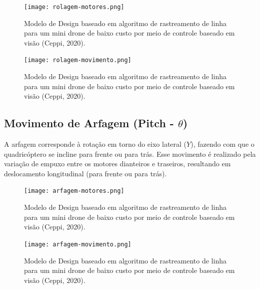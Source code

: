 \begin{figure}[ht]
	\centering
	\texttt{[image: rolagem-motores.png]} %
	\caption{Modelo de Design baseado em algoritmo de rastreamento de linha para um mini drone de baixo custo por meio de controle baseado em visão (Ceppi, 2020).}
	\label{fig:line_tracking_algorithm}
\end{figure}

\begin{figure}[ht]
	\centering
	\texttt{[image: rolagem-movimento.png]} %
	\caption{Modelo de Design baseado em algoritmo de rastreamento de linha para um mini drone de baixo custo por meio de controle baseado em visão (Ceppi, 2020).}
	\label{fig:line_tracking_algorithm}
\end{figure}




\subsection{Movimento de Arfagem (Pitch - $\theta$)}
A arfagem corresponde à rotação em torno do eixo lateral ($Y$), fazendo com que o quadricóptero se incline para frente ou para trás. Esse movimento é realizado pela variação de empuxo entre os motores dianteiros e traseiros, resultando em deslocamento longitudinal (para frente ou para trás).

\begin{figure}[ht]
	\centering
	\texttt{[image: arfagem-motores.png]} %
	\caption{Modelo de Design baseado em algoritmo de rastreamento de linha para um mini drone de baixo custo por meio de controle baseado em visão (Ceppi, 2020).}
	\label{fig:line_tracking_algorithm}
\end{figure}


\begin{figure}[ht]
	\centering
	\texttt{[image: arfagem-movimento.png]} %
	\caption{Modelo de Design baseado em algoritmo de rastreamento de linha para um mini drone de baixo custo por meio de controle baseado em visão (Ceppi, 2020).}
	\label{fig:line_tracking_algorithm}
\end{figure}



